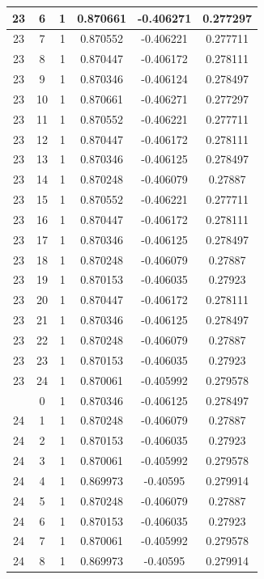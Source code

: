 \documentclass[12pt,a4paper]{article}
\numberwithin{equation}{section}
\numberwithin{figure}{section}
\numberwithin{table}{section}
\begin{document}
\begin{longtable}{|c|c|c|c|c|c|}
23 & 6 & 1 & 0.870661 & -0.406271 & 0.277297 \\ \hline
23 & 7 & 1 & 0.870552 & -0.406221 & 0.277711 \\ \hline
23 & 8 & 1 & 0.870447 & -0.406172 & 0.278111 \\ \hline
23 & 9 & 1 & 0.870346 & -0.406124 & 0.278497 \\ \hline
23 & 10 & 1 & 0.870661 & -0.406271 & 0.277297 \\ \hline
23 & 11 & 1 & 0.870552 & -0.406221 & 0.277711 \\ \hline
23 & 12 & 1 & 0.870447 & -0.406172 & 0.278111 \\ \hline
23 & 13 & 1 & 0.870346 & -0.406125 & 0.278497 \\ \hline
23 & 14 & 1 & 0.870248 & -0.406079 & 0.27887 \\ \hline
23 & 15 & 1 & 0.870552 & -0.406221 & 0.277711 \\ \hline
23 & 16 & 1 & 0.870447 & -0.406172 & 0.278111 \\ \hline
23 & 17 & 1 & 0.870346 & -0.406125 & 0.278497 \\ \hline
23 & 18 & 1 & 0.870248 & -0.406079 & 0.27887 \\ \hline
23 & 19 & 1 & 0.870153 & -0.406035 & 0.27923 \\ \hline
23 & 20 & 1 & 0.870447 & -0.406172 & 0.278111 \\ \hline
23 & 21 & 1 & 0.870346 & -0.406125 & 0.278497 \\ \hline
23 & 22 & 1 & 0.870248 & -0.406079 & 0.27887 \\ \hline
23 & 23 & 1 & 0.870153 & -0.406035 & 0.27923 \\ \hline
23 & 24 & 1 & 0.870061 & -0.405992 & 0.279578 \\ \hline
\pagebreak
24 & 0 & 1 & 0.870346 & -0.406125 & 0.278497 \\ \hline
24 & 1 & 1 & 0.870248 & -0.406079 & 0.27887 \\ \hline
24 & 2 & 1 & 0.870153 & -0.406035 & 0.27923 \\ \hline
24 & 3 & 1 & 0.870061 & -0.405992 & 0.279578 \\ \hline
24 & 4 & 1 & 0.869973 & -0.40595 & 0.279914 \\ \hline
24 & 5 & 1 & 0.870248 & -0.406079 & 0.27887 \\ \hline
24 & 6 & 1 & 0.870153 & -0.406035 & 0.27923 \\ \hline
24 & 7 & 1 & 0.870061 & -0.405992 & 0.279578 \\ \hline
24 & 8 & 1 & 0.869973 & -0.40595 & 0.279914 \\ \hline

\end{longtable}
\end{document}
